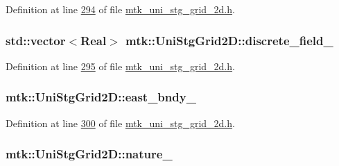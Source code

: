 Definition at line \hyperlink{mtk__uni__stg__grid__2d_8h_source_l00294}{294} of file \hyperlink{mtk__uni__stg__grid__2d_8h_source}{mtk\+\_\+uni\+\_\+stg\+\_\+grid\+\_\+2d.\+h}.

\hypertarget{classmtk_1_1UniStgGrid2D_ad7474b2669ee988b84aed20b7f5dc7be}{
\subsubsection[{discrete\+\_\+field\+\_\+}]{\setlength{\rightskip}{0pt plus 5cm}std\+::vector$<${\bf Real}$>$ mtk\+::\+Uni\+Stg\+Grid2\+D\+::discrete\+\_\+field\+\_\+\hspace{0.3cm}{\ttfamily [private]}}}\label{classmtk_1_1UniStgGrid2D_ad7474b2669ee988b84aed20b7f5dc7be}


Definition at line \hyperlink{mtk__uni__stg__grid__2d_8h_source_l00295}{295} of file \hyperlink{mtk__uni__stg__grid__2d_8h_source}{mtk\+\_\+uni\+\_\+stg\+\_\+grid\+\_\+2d.\+h}.

\hypertarget{classmtk_1_1UniStgGrid2D_ae24f3d5bf5ed3a6d066cdf48aa1fb307}{
\subsubsection[{east\+\_\+bndy\+\_\+}]{ mtk\+::\+Uni\+Stg\+Grid2\+D\+::east\+\_\+bndy\+\_\+\hspace{0.3cm}{\ttfamily [private]}}}\label{classmtk_1_1UniStgGrid2D_ae24f3d5bf5ed3a6d066cdf48aa1fb307}


Definition at line \hyperlink{mtk__uni__stg__grid__2d_8h_source_l00300}{300} of file \hyperlink{mtk__uni__stg__grid__2d_8h_source}{mtk\+\_\+uni\+\_\+stg\+\_\+grid\+\_\+2d.\+h}.

\hypertarget{classmtk_1_1UniStgGrid2D_ac8b66740d328803f7fbabd1c42c775b2}{
\subsubsection[{nature\+\_\+}]{ mtk\+::\+Uni\+Stg\+Grid2\+D\+::nature\+\_\+\hspace{0.3cm}{\ttfamily [private]}}}\label{classmtk_1_1UniStgGrid2D_ac8b66740d328803f7fbabd1c42c775b2}


